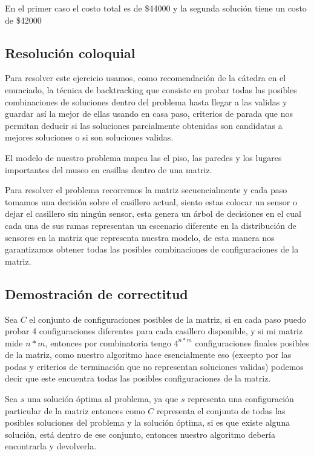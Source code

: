 En el primer caso el costo total es de \$44000 y la segunda solución tiene un costo de \$42000

\subsection{Resolución coloquial}

Para resolver este ejercicio usamos, como recomendación de la cátedra en el enunciado, la técnica de backtracking que consiste en probar todas las posibles combinaciones de soluciones dentro del problema hasta llegar a las validas y guardar así la mejor de ellas usando en casa paso, criterios de parada que nos permitan deducir si las soluciones parcialmente obtenidas son candidatas a mejores soluciones o si son soluciones validas.

El modelo de nuestro problema mapea las el piso, las paredes y los lugares importantes del museo en casillas dentro de una matriz.

Para resolver el problema recorremos la matriz secuencialmente y cada paso tomamos una decisión sobre el casillero actual, siento estas colocar un sensor o dejar el casillero sin ningún sensor, esta genera un árbol de decisiones en el cual cada una de sus ramas representan un escenario diferente en la distribución de sensores en la matriz que representa nuestra modelo, de esta manera nos garantizamos obtener todas las posibles combinaciones de configuraciones de la matriz.

\subsection{Demostración de correctitud}

Sea $C$ el conjunto de configuraciones posibles de la matriz, si en cada paso puedo probar 4 configuraciones diferentes para cada casillero disponible, y si mi matriz mide $n*m$, entonces por combinatoria tengo $4^{n*m}$ configuraciones finales posibles de la matriz, como nuestro algoritmo hace esencialmente eso (excepto por las podas y criterios de terminación que no representan soluciones validas) podemos decir que este encuentra todas las posibles configuraciones de la matriz.

Sea $s$ una solución óptima al problema, ya que $s$ representa una configuración particular de la matriz entonces como $C$ representa el conjunto de todas las posibles soluciones del problema y la solución óptima, si es que existe alguna solución, está dentro de ese conjunto, entonces nuestro algoritmo debería encontrarla y devolverla.

